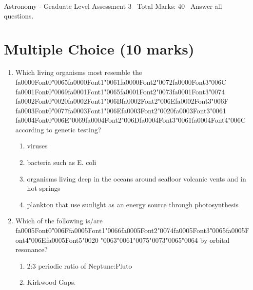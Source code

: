 \documentclass[12pt]{article}
\begin{document}
\begin{center}
Astronomy - Graduate Level Assessment 3 \
Total Marks: 40 \
Answer all questions.
\end{center}

\section*{Multiple Choice (10 marks)}
\begin{enumerate}[label=\arabic*.]
\item Which living organisms most resemble the {\csname fa0000Font0\endcsname\char"0065}{\csname fa0000Font1\endcsname\char"0061}{\csname fa0000Font2\endcsname\char"0072}{\csname fa0000Font3\endcsname\char"006C} {\csname fa0001Font0\endcsname\char"0069}{\csname fa0001Font1\endcsname\char"0065}{\csname fa0001Font2\endcsname\char"0073}{\csname fa0001Font3\endcsname\char"0074} {\csname fa0002Font0\endcsname\char"0020}{\csname fa0002Font1\endcsname\char"006B}{\csname fa0002Font2\endcsname\char"006E}{\csname fa0002Font3\endcsname\char"006F} {\csname fa0003Font0\endcsname\char"0077}{\csname fa0003Font1\endcsname\char"006E}{\csname fa0003Font2\endcsname\char"0020}{\csname fa0003Font3\endcsname\char"0061} {\csname fa0004Font0\endcsname\char"006E}{\char"0069}{\csname fa0004Font2\endcsname\char"006D}{\csname fa0004Font3\endcsname\char"0061}{\csname fa0004Font4\endcsname\char"006C} according to genetic
testing?
\begin{enumerate}[label=(\alph*)]
    \item viruses
    \item bacteria such as E. coli
    \item organisms living deep in the oceans around seafloor volcanic vents and in hot springs
    \item plankton that use sunlight as an energy source through photosynthesis
\end{enumerate}
\item Which of the following is/are {\csname fa0005Font0\endcsname\char"006F}{\csname fa0005Font1\endcsname\char"0066}{\csname fa0005Font2\endcsname\char"0074}{\csname fa0005Font3\endcsname\char"0065}{\csname fa0005Font4\endcsname\char"006E}{\csname fa0005Font5\endcsname\char"0020} {\char"0063}{\char"0061}{\char"0075}{\char"0073}{\char"0065}{\char"0064} by orbital resonance?
\begin{enumerate}[label=(\alph*)]
    \item 2:3 periodic ratio of Neptune:Pluto
    \item Kirkwood Gaps.

\end{enumerate}
\end{enumerate}
\end{document}
